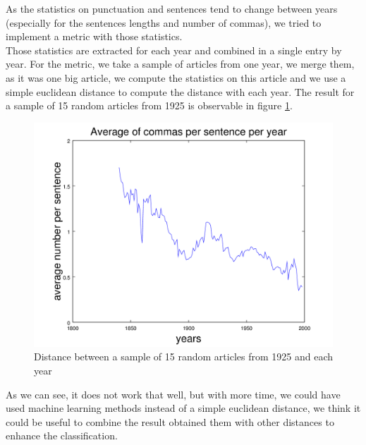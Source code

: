 As the statistics on punctuation and sentences tend to change between years (especially for the sentences lengths and number of commas), we tried to implement a metric with those statistics. \\

Those statistics are extracted for each year and combined in a single entry by year. For the metric, we take a sample of articles from one year, we merge them, as it was one big article, we compute the statistics on this article and we use a simple euclidean distance to compute the distance with each year. The result for a sample of 15 random articles from 1925 is observable in figure \ref{punct_metric_1925}.

\begin{figure}[H]
	\centering
    \includegraphics[scale=0.5]{Pictures/date_articles/punctuation/graph.png}
    \caption{Distance between a sample of 15 random articles from 1925 and each year}
    \label{punct_metric_1925}\hfill
\end{figure}

As we can see, it does not work that well, but with more time, we could have used machine learning methods instead of a simple euclidean distance, we think it could be useful to combine the result obtained them with other distances to enhance the classification.